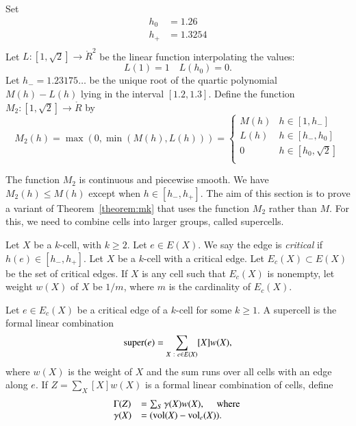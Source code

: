 \begin{definition}
Set
$$
\begin{array}{lll}
  h_0  &= 1.26\\
  h_+  &= 1.3254\\
\end{array}
$$
Let $L:[1,\sqrt{2}]\to\ring{R}^2$ be the linear function interpolating the
values:
$$
L(1) = 1\quad L(h_0) = 0.
$$
Let $h_- = 1.23175\ldots$ be the unique root of the quartic polynomial
$M(h)-L(h)$ lying in the interval $[1.2,1.3]$.
Define the function $M_2:[1,\sqrt{2}]\to\ring{R}$ by
$$
M_2(h) = \max(0,\min(M(h),L(h))) = 
\begin{cases}
  M(h) & h \in [1,h_-]\\
  L(h) & h \in [h_-,h_0]\\
  0 & h \in [h_0,\sqrt2]\\
\end{cases}
$$
\end{definition}

The function $M_2$ is continuous and piecewise smooth.  We have
$M_2(h)\le M(h)$ except when $h\in [h_-,h_+]$.  The aim of this section is to prove a variant of Theorem~\ref{theorem:mk} that uses the function $M_2$ rather than $M$.  For this, we need to combine cells into larger groups, called supercells.

\begin{definition}
Let $X$ be a $k$-cell, with $k\ge 2$.  Let $e\in E(X)$.
We say the edge is {\it critical} if $h(e)\in[h_-,h_+]$.
Let $X$ be a $k$-cell with a critical edge.  Let $E_c(X)\subset E(X)$
be the set of critical edges.  If $X$ is any cell such that
$E_c(X)$ is nonempty, let weight $w(X)$ of $X$  
be $1/m$, where
$m$ is the cardinality of $E_c(X)$.
\end{definition}

\begin{definition}
Let $e\in E_c(X)$ be a critical edge of a $k$-cell for some $k\ge 1$.
A supercell is the formal linear combination
$$
{\operatorname{super}}(e) = \sum_{X\ :\  e\in E(X)} [X] w(X),
$$
where $w(X)$ is the weight of $X$ and the sum runs over all cells with an edge along $e$.  If $Z = \sum_X [X] w(X)$ is a formal linear combination of cells, define
$$
\begin{array}{lll}
\Gamma(Z) &= \sum_S \gamma(X) w(X),\quad\hbox{ where }\\
\gamma(X) &=  ({\operatorname{vol}}(X)-{\operatorname{vol}}_e(X)).
\end{array}
$$

\end{definition}

